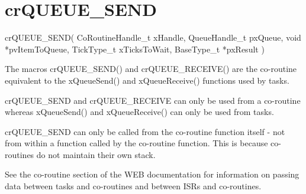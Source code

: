 \hypertarget{group__cr_q_u_e_u_e___s_e_n_d}{}\section{cr\+Q\+U\+E\+U\+E\+\_\+\+S\+E\+N\+D}
\label{group__cr_q_u_e_u_e___s_e_n_d}

\begin{DoxyPre}
crQUEUE\_SEND(
                 CoRoutineHandle\_t xHandle,
                 QueueHandle\_t pxQueue,
                 void *pvItemToQueue,
                 TickType\_t xTicksToWait,
                 BaseType\_t *pxResult
            )\end{DoxyPre}


The macro\textquotesingle{}s cr\+Q\+U\+E\+U\+E\+\_\+\+S\+E\+N\+D() and cr\+Q\+U\+E\+U\+E\+\_\+\+R\+E\+C\+E\+I\+V\+E() are the co-\/routine equivalent to the x\+Queue\+Send() and x\+Queue\+Receive() functions used by tasks.

cr\+Q\+U\+E\+U\+E\+\_\+\+S\+E\+N\+D and cr\+Q\+U\+E\+U\+E\+\_\+\+R\+E\+C\+E\+I\+V\+E can only be used from a co-\/routine whereas x\+Queue\+Send() and x\+Queue\+Receive() can only be used from tasks.

cr\+Q\+U\+E\+U\+E\+\_\+\+S\+E\+N\+D can only be called from the co-\/routine function itself -\/ not from within a function called by the co-\/routine function. This is because co-\/routines do not maintain their own stack.

See the co-\/routine section of the W\+E\+B documentation for information on passing data between tasks and co-\/routines and between I\+S\+R\textquotesingle{}s and co-\/routines.


